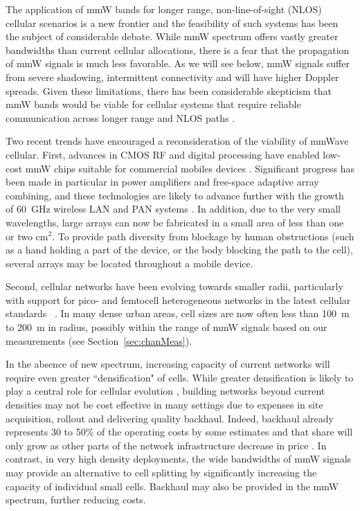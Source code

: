 \documentclass[journal]{IEEEtran}
\begin{document}
The application of mmW bands for longer range, non-line-of-sight (NLOS)
cellular scenarios is a new frontier
and the feasibility of such systems has been the subject of considerable debate.
While mmW spectrum offers vastly greater bandwidths than current cellular
allocations,
there is a fear that the propagation of mmW signals is much less favorable.
As we will see below, mmW signals suffer from severe shadowing,
intermittent connectivity and will have higher Doppler spreads.
Given these limitations,  there has been considerable skepticism that
mmW bands would be viable for cellular systems
that require reliable communication across longer range and NLOS
paths \cite{Daniels:10,rappaportmillimeter}.

Two recent trends have encouraged a reconsideration of the viability of mmWave cellular.
First, advances in CMOS RF and digital processing have enabled low-cost
mmW chips suitable for commercial mobiles devices
 \cite{Doan:04,Ted:60Gstate11,Rappaport:13-BBmmW}.
Significant progress has been made in particular in power amplifiers and
free-space adaptive array combining, and
these technologies are likely to advance further with the growth of 60~GHz wireless LAN
and PAN systems \cite{Ted:60Gstate11,Daniels:10,PerCPY:10,VauNic:10,Baykas-WPAN:11}.
In addition, due to the very small wavelengths,
large arrays can now be fabricated in a small area
of less than one or two cm$^2$.
To provide path diversity from blockage by human obstructions (such
as a hand holding a part of the device, or the body blocking the path to the cell),
several arrays may be located throughout a mobile device.

Second, cellular networks have been evolving towards smaller radii,
particularly with support for
pico- and femtocell heterogeneous networks in the latest cellular standards
~\cite{Ortiz:08,ChaAndG:08,YehTLK:08,FemtoForum:10,AndrewsCDRC:12}.
In many dense urban areas, cell sizes are now often less than 100~m to 200~m
in radius, possibly within the range
of mmW signals based on our measurements (see Section~\ref{sec:chanMeas}).

In the absence of new spectrum, increasing
capacity of current networks will require even greater ``densification" of cells.
While greater densification is likely to play a central role
for cellular evolution \cite{FemtoForum:10,AndrewsCDRC:12,Qualcomm-SmallCell},
building networks beyond current
densities may not be cost effective in many settings due to
expenses in site acquisition, rollout and delivering quality
backhaul.  Indeed, backhaul already represents 30 to 50\% of the operating
costs by some estimates  \cite{financial_picos,senza_backhaul}
and that share will only grow as other parts of the network infrastructure
decrease in price
\cite{backhaul_blog_1,backhaul_blog_2,financial_picos}.
In contrast, in very high density deployments, the wide bandwidths of mmW signals
may provide an alternative to cell splitting by significantly increasing the capacity
of individual small cells.
Backhaul may also be provided in the mmW spectrum, further reducing costs.
\end{document}
